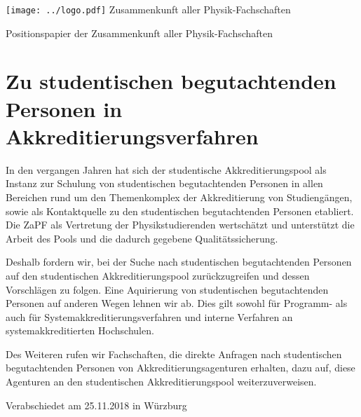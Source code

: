 \documentclass[DIV=calc]{scrartcl}
\begin{document}
    \hspace{0.87\textwidth}
    \begin{minipage}{120pt}
        \vspace{-1.8cm}
        \texttt{[image: ../logo.pdf]}
        \centering
        \small Zusammenkunft aller Physik-Fachschaften
    \end{minipage}
    \begin{center}
        \huge{Positionspapier der Zusammenkunft aller Physik-Fachschaften}\vspace{.25\baselineskip}\\
        \normalsize
    \end{center}
    \vspace{1cm}


\section*{Zu studentischen begutachtenden Personen in Akkreditierungsverfahren}
In den vergangen Jahren hat sich der studentische Akkreditierungspool als Instanz zur Schulung von studentischen begutachtenden Personen in allen Bereichen rund um den Themenkomplex der Akkreditierung von Studiengängen, sowie als Kontaktquelle zu den studentischen begutachtenden Personen etabliert. Die ZaPF als Vertretung der Physikstudierenden wertschätzt und unterstützt die Arbeit des Pools und die dadurch gegebene Qualitätssicherung.

Deshalb fordern wir, bei der Suche nach studentischen begutachtenden Personen auf den studentischen Akkreditierungspool zurückzugreifen und dessen Vorschlägen zu folgen. Eine Aquirierung von studentischen begutachtenden Personen auf anderen Wegen lehnen wir ab. Dies gilt sowohl für Programm- als auch für Systemakkreditierungsverfahren und interne Verfahren an systemakkreditierten Hochschulen.

Des Weiteren rufen wir Fachschaften, die direkte Anfragen nach studentischen begutachtenden Personen von Akkreditierungsagenturen erhalten, dazu auf, diese Agenturen an den studentischen Akkreditierungspool weiterzuverweisen.
\vfill
    \begin{flushright}
        Verabschiedet am 25.11.2018 in Würzburg
    \end{flushright}
\end{document}
